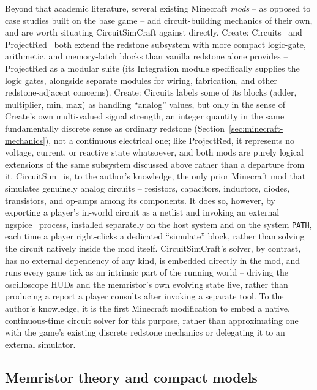 Beyond that academic literature, several existing Minecraft \emph{mods} -- as opposed to
case studies built on the base game -- add circuit-building mechanics of their own, and are
worth situating CircuitSimCraft against directly. Create: Circuits~\cite{chocoboyy2026createcircuits}
and ProjectRed~\cite{mrtjp2026projectred} both extend the redstone subsystem with more
compact logic-gate, arithmetic, and memory-latch blocks than vanilla redstone alone provides
-- ProjectRed as a modular suite (its Integration module specifically supplies the logic
gates, alongside separate modules for wiring, fabrication, and other redstone-adjacent
concerns). Create: Circuits labels some of its blocks (adder, multiplier, min, max) as
handling ``analog'' values, but only in the sense of Create's own multi-valued signal
strength, an integer quantity in the same fundamentally discrete sense as ordinary redstone
(Section~\ref{sec:minecraft-mechanics}), not a continuous electrical one; like ProjectRed, it
represents no voltage, current, or reactive state whatsoever, and both mods are purely
logical extensions of the same subsystem discussed above rather than a departure from it.
CircuitSim~\cite{dankov2026circuitsim} is, to the author's knowledge, the only prior
Minecraft mod that simulates genuinely analog circuits -- resistors, capacitors, inductors,
diodes, transistors, and op-amps among its components. It does so, however, by exporting a
player's in-world circuit as a netlist and invoking an external ngspice~\cite{nagel1973spice}
process, installed separately on the host system and on the system \texttt{PATH}, each time a
player right-clicks a dedicated ``simulate'' block, rather than solving the circuit natively
inside the mod itself. CircuitSimCraft's solver, by contrast, has no external dependency of any
kind, is embedded directly in the mod, and runs every game tick as an intrinsic part of the
running world -- driving the oscilloscope HUDs and the memristor's own evolving state live,
rather than producing a report a player consults after invoking a separate tool. To the
author's knowledge, it is the first Minecraft modification to embed a native, continuous-time
circuit solver for this purpose, rather than approximating one with the game's existing
discrete redstone mechanics or delegating it to an external simulator.

\subsection{Memristor theory and compact models}

